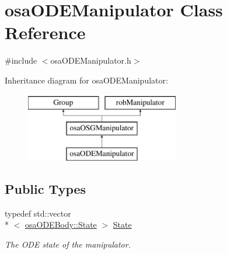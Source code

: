 \hypertarget{classosa_o_d_e_manipulator}{\section{osa\-O\-D\-E\-Manipulator Class Reference}
\label{classosa_o_d_e_manipulator}
}


{\ttfamily \#include $<$osa\-O\-D\-E\-Manipulator.\-h$>$}

Inheritance diagram for osa\-O\-D\-E\-Manipulator\-:\begin{figure}[H]
\begin{center}
\leavevmode
\includegraphics[height=3.000000cm]{d6/dbb/classosa_o_d_e_manipulator}
\end{center}
\end{figure}
\subsection*{Public Types}
\begin{DoxyCompactItemize}
\item 
typedef std\-::vector\\*
$<$ \hyperlink{structosa_o_d_e_body_1_1_state}{osa\-O\-D\-E\-Body\-::\-State} $>$ \hyperlink{classosa_o_d_e_manipulator_a56c8457aa6c0240b62580dcfce383ed2}{State}
\begin{DoxyCompactList}\small\item\em The O\-D\-E state of the manipulator. \end{DoxyCompactList}\end{DoxyCompactItemize}
